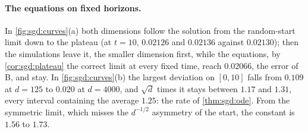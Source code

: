 \begin{refsection}
\paragraph{The equations on fixed horizons.} In \cref{fig:sgd:curves}(a) both dimensions follow the solution from the random-start limit down to the plateau (at $t=10$, $0.02126$ and $0.02136$ against $0.02130$); then the simulations leave it, the smaller dimension first, while the equations, by \cref{cor:sgd:plateau} the correct limit at every fixed time, reach $0.02066$, the error of B, and stay. In \cref{fig:sgd:curves}(b) the largest deviation on $[0,10]$ falls from $0.109$ at $d=125$ to $0.020$ at $d=4000$, and $\sqrt d$ times it stays between $1.17$ and $1.31$, every interval containing the average $1.25$: the rate of \cref{thm:sgd:ode}. From the symmetric limit, which misses the $d^{-1/2}$ asymmetry of the start, the constant is $1.56$ to $1.73$.


\end{refsection}
